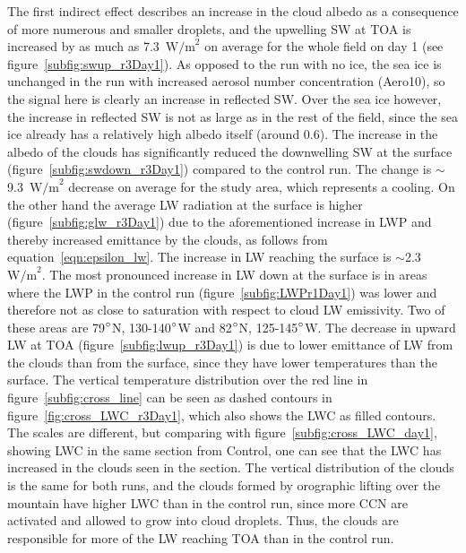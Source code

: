 The first indirect effect describes an increase in the cloud albedo as a consequence of more numerous and smaller droplets, and the upwelling SW at TOA is increased by as much as 7.3~$\text{W/m}^2$ on average for the whole field on day 1 (see figure~\ref{subfig:swup_r3Day1}). As opposed to the run with no ice, the sea ice is unchanged in the run with increased aerosol number concentration (Aero10), so the signal here is clearly an increase in reflected SW. Over the sea ice however, the increase in reflected SW is not as large as in the rest of the field, since the sea ice already has a relatively high albedo itself (around 0.6). The increase in the albedo of the clouds has significantly reduced the downwelling SW at the surface (figure~\ref{subfig:swdown_r3Day1}) compared to the control run. The change is $\sim$9.3~$\text{W/m}^2$ decrease on average for the study area, which represents a cooling. On the other hand the average LW radiation at the surface is higher (figure~\ref{subfig:glw_r3Day1}) due to the aforementioned increase in LWP and thereby increased emittance by the clouds, as follows from equation~\ref{eqn:epsilon_lw}. The increase in LW reaching the surface is $\sim$2.3~$\text{W/m}^2$. The most pronounced increase in LW down at the surface is in areas where the LWP in the control run (figure~\ref{subfig:LWPr1Day1}) was lower and therefore not as close to saturation with respect to cloud LW emissivity. Two of these areas are 79$\degree$N, 130-140$\degree$W and 82$\degree$N, 125-145$\degree$W. The decrease in upward LW at TOA (figure~\ref{subfig:lwup_r3Day1}) is due to lower emittance of LW from the clouds than from the surface, since they have lower temperatures than the surface. The vertical temperature distribution over the red line in figure~\ref{subfig:cross_line} can be seen as dashed contours in figure~\ref{fig:cross_LWC_r3Day1}, which also shows the LWC as filled contours. The scales are different, but comparing with figure~\ref{subfig:cross_LWC_day1}, showing LWC in the same section from Control, one can see that the LWC has increased in the clouds seen in the section. The vertical distribution of the clouds is the same for both runs, and the clouds formed by orographic lifting over the mountain have higher LWC than in the control run, since more CCN are activated and allowed to grow into cloud droplets. Thus, the clouds are responsible for more of the LW reaching TOA than in the control run.

